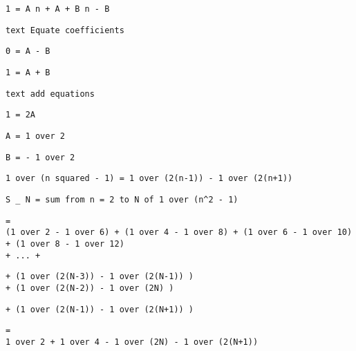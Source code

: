 \documentclass[12pt]{article}
\begin{document}
\noindent \begin{verbatim}
1 = A n + A + B n - B
\end{verbatim}

\noindent \begin{verbatim}
text Equate coefficients
\end{verbatim}

\noindent \begin{verbatim}
0 = A - B
\end{verbatim}

\noindent \begin{verbatim}
1 = A + B
\end{verbatim}

\noindent \begin{verbatim}
text add equations
\end{verbatim}

\noindent \begin{verbatim}
1 = 2A
\end{verbatim}

\noindent \begin{verbatim}
A = 1 over 2
\end{verbatim}

\noindent \begin{verbatim}
B = - 1 over 2
\end{verbatim}

\noindent \begin{verbatim}
1 over (n squared - 1) = 1 over (2(n-1)) - 1 over (2(n+1))
\end{verbatim}

\noindent \begin{verbatim}
S _ N = sum from n = 2 to N of 1 over (n^2 - 1)
\end{verbatim}

\noindent \begin{verbatim}
=
(1 over 2 - 1 over 6) + (1 over 4 - 1 over 8) + (1 over 6 - 1 over 10)
+ (1 over 8 - 1 over 12)
+ ... +
\end{verbatim}

\noindent \begin{verbatim}
+ (1 over (2(N-3)) - 1 over (2(N-1)) )
+ (1 over (2(N-2)) - 1 over (2N) )
\end{verbatim}

\noindent \begin{verbatim}
+ (1 over (2(N-1)) - 1 over (2(N+1)) )
\end{verbatim}

\noindent \begin{verbatim}
=
1 over 2 + 1 over 4 - 1 over (2N) - 1 over (2(N+1))
\end{verbatim}
\end{document}
